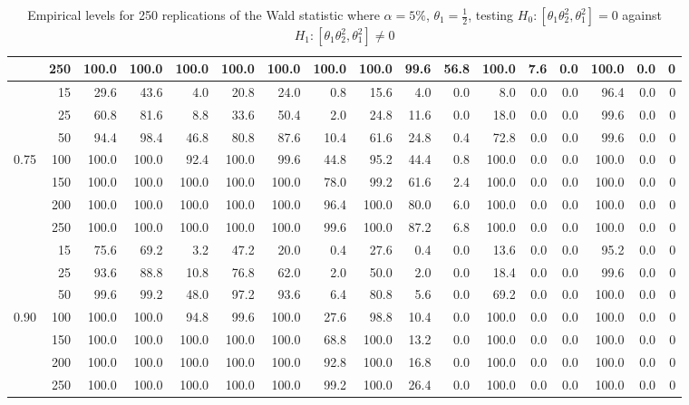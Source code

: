 \documentclass[]{article}\usepackage[]{graphicx}\usepackage[]{color}
\begin{document}
\begin{table}[H]
{\begin{tabular}{|r|r|r|r|r|r|r|r|r|r|r|r|r|r|r|r|r|}
			& 250 & 100.0 & 100.0 & 100.0 & 100.0 & 100.0 & 100.0 & 100.0 & 99.6 & 56.8 & 100.0 & 7.6 & 0.0 & 100.0 & 0.0 & 0 \\
			\hline
			& 15 & 29.6 & 43.6 & 4.0 & 20.8 & 24.0 & 0.8 & 15.6 & 4.0 & 0.0 & 8.0 & 0.0 & 0.0 & 96.4 & 0.0 & 0 \\
			& 25 & 60.8 & 81.6 & 8.8 & 33.6 & 50.4 & 2.0 & 24.8 & 11.6 & 0.0 & 18.0 & 0.0 & 0.0 & 99.6 & 0.0 & 0 \\
			& 50 & 94.4 & 98.4 & 46.8 & 80.8 & 87.6 & 10.4 & 61.6 & 24.8 & 0.4 & 72.8 & 0.0 & 0.0 & 99.6 & 0.0 & 0 \\
			0.75 & 100 & 100.0 & 100.0 & 92.4 & 100.0 & 99.6 & 44.8 & 95.2 & 44.4 & 0.8 & 100.0 & 0.0 & 0.0 & 100.0 & 0.0 & 0 \\
			& 150 & 100.0 & 100.0 & 100.0 & 100.0 & 100.0 & 78.0 & 99.2 & 61.6 & 2.4 & 100.0 & 0.0 & 0.0 & 100.0 & 0.0 & 0 \\
			& 200 & 100.0 & 100.0 & 100.0 & 100.0 & 100.0 & 96.4 & 100.0 & 80.0 & 6.0 & 100.0 & 0.0 & 0.0 & 100.0 & 0.0 & 0 \\
			& 250 & 100.0 & 100.0 & 100.0 & 100.0 & 100.0 & 99.6 & 100.0 & 87.2 & 6.8 & 100.0 & 0.0 & 0.0 & 100.0 & 0.0 & 0 \\
			\hline
			& 15 & 75.6 & 69.2 & 3.2 & 47.2 & 20.0 & 0.4 & 27.6 & 0.4 & 0.0 & 13.6 & 0.0 & 0.0 & 95.2 & 0.0 & 0 \\
			& 25 & 93.6 & 88.8 & 10.8 & 76.8 & 62.0 & 2.0 & 50.0 & 2.0 & 0.0 & 18.4 & 0.0 & 0.0 & 99.6 & 0.0 & 0 \\
			& 50 & 99.6 & 99.2 & 48.0 & 97.2 & 93.6 & 6.4 & 80.8 & 5.6 & 0.0 & 69.2 & 0.0 & 0.0 & 100.0 & 0.0 & 0 \\
			0.90 & 100 & 100.0 & 100.0 & 94.8 & 99.6 & 100.0 & 27.6 & 98.8 & 10.4 & 0.0 & 100.0 & 0.0 & 0.0 & 100.0 & 0.0 & 0 \\
			& 150 & 100.0 & 100.0 & 100.0 & 100.0 & 100.0 & 68.8 & 100.0 & 13.2 & 0.0 & 100.0 & 0.0 & 0.0 & 100.0 & 0.0 & 0 \\
			& 200 & 100.0 & 100.0 & 100.0 & 100.0 & 100.0 & 92.8 & 100.0 & 16.8 & 0.0 & 100.0 & 0.0 & 0.0 & 100.0 & 0.0 & 0 \\
			& 250 & 100.0 & 100.0 & 100.0 & 100.0 & 100.0 & 99.2 & 100.0 & 26.4 & 0.0 & 100.0 & 0.0 & 0.0 & 100.0 & 0.0 & 0 \\
			\hline
		\end{tabular}
	}
	\caption{Empirical levels for 250 replications of the Wald statistic where $\alpha = 5\%$, $\theta_1=\frac{1}{2}$, testing $H_0: \left[ \theta_1\theta_2^2, \theta_1^2\right] =0$ against $H_1: \left[ \theta_1\theta_2^2, \theta_1^2\right] \neq 0$}
	\label{tbl:W:15}
\end{table}
\end{document}
